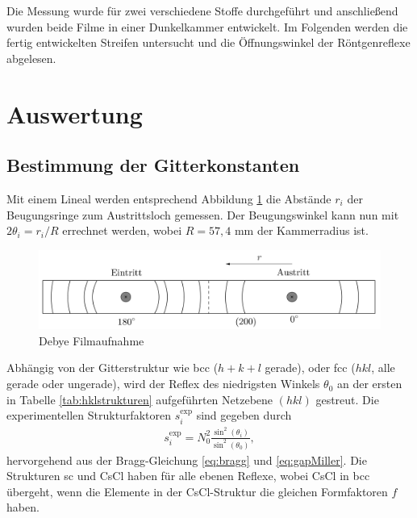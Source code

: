 Die Messung wurde für zwei verschiedene Stoffe durchgeführt und anschließend wurden beide Filme in einer Dunkelkammer entwickelt. Im Folgenden werden die fertig entwickelten Streifen untersucht und die Öffnungswinkel der Röntgenreflexe abgelesen.  

\section{Auswertung}
\subsection{Bestimmung der Gitterkonstanten}
Mit einem Lineal werden entsprechend Abbildung \ref{pic:debyefilm} die Abstände $r_i$ der Beugungsringe zum Austrittsloch gemessen. Der 
Beugungswinkel kann nun mit $2\theta_i = r_i/R$ errechnet werden, wobei $R=57,4$ mm der Kammerradius ist. 
\begin{figure}[H]
 \includegraphics[width=\textwidth]{../pics/debyestreifen.jpg}
 \caption{Debye Filmaufnahme}
 \label{pic:debyefilm}
\end{figure}
\noindent Abhängig von der Gitterstruktur wie bcc ($h+k+l$ gerade), oder fcc ($hkl$, alle gerade oder ungerade),
wird der Reflex des niedrigsten Winkels $\theta_0$ an der ersten in Tabelle \ref{tab:hklstrukturen} aufgeführten Netzebene $(hkl)$
gestreut. 
Die experimentellen Strukturfaktoren $s^\text{exp}_i$ sind gegeben durch
\begin{align}
 s^\text{exp}_i = N^2_0 \frac{\sin^2(\theta_i)}{\sin^2(\theta_0)},
 \label{eq:structExp}
\end{align}
hervorgehend aus der Bragg-Gleichung \eqref{eq:bragg} und \eqref{eq:gapMiller}. Die Strukturen sc und CsCl haben für alle ebenen Reflexe, wobei CsCl
in bcc übergeht, wenn die Elemente in der CsCl-Struktur die gleichen Formfaktoren $f$ haben.
